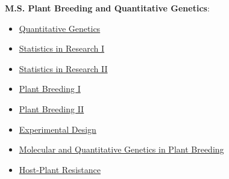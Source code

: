 \textbf{M.S. Plant Breeding and Quantitative Genetics}:
\vspace{-.7cm}
\begin{multicols}{3}
\begin{itemize}[left=0.2cm, itemsep=-0.15cm]
    \item \href{http://catalog.tamu.edu/search/?P=GENE\%20613}{{\color{black}Quantitative Genetics}}
    \item \href{http://catalog.tamu.edu/search/?P=STAT\%20651}{{\color{black}Statistics in Research I}}
    \item \href{http://catalog.tamu.edu/search/?P=STAT\%20652}{{\color{black}Statistics in Research II}}
    \item \href{http://catalog.tamu.edu/search/?P=SCSC\%20641}{{\color{black}Plant Breeding I}}
    \item \href{http://catalog.tamu.edu/search/?P=SCSC\%20642}{{\color{black}Plant Breeding II}}
    \item \href{http://catalog.tamu.edu/search/?P=SCSC\%20660}{{\color{black}Experimental Design}}
    \item \href{http://catalog.tamu.edu/search/?P=SCSC\%20643}{{\color{black}Molecular and Quantitative Genetics in Plant Breeding}}
    \item \href{http://catalog.tamu.edu/search/?P=SCSC\%20610}{{\color{black}Host-Plant Resistance}}
\end{itemize}
\end{multicols}

\vspace{-0.5cm}